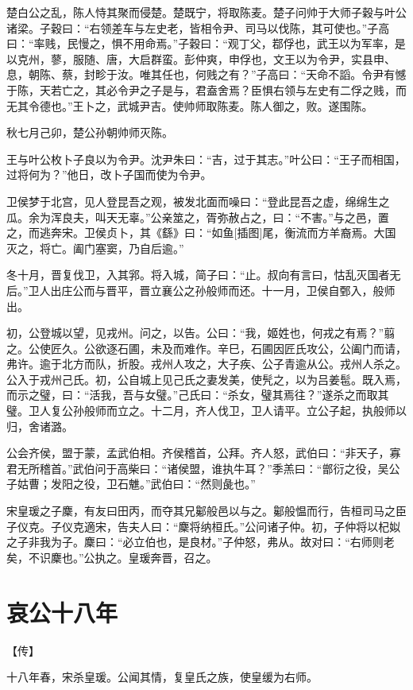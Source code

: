 \documentclass[a4paper,12pt,UTF8,twoside]{ctexbook}
\begin{document}
楚白公之乱，陈人恃其聚而侵楚。楚既宁，将取陈麦。楚子问帅于大师子穀与叶公诸梁。子穀曰：“右领差车与左史老，皆相令尹、司马以伐陈，其可使也。”子高曰：“率贱，民慢之，惧不用命焉。”子穀曰：“观丁父，鄀俘也，武王以为军率，是以克州，蓼，服随、唐，大启群蛮。彭仲爽，申俘也，文王以为令尹，实县申、息，朝陈、蔡，封畛于汝。唯其任也，何贱之有？”子高曰：“天命不謟。令尹有憾于陈，天若亡之，其必令尹之子是与，君盍舍焉？臣惧右领与左史有二俘之贱，而无其令德也。”王卜之，武城尹吉。使帅师取陈麦。陈人御之，败。遂围陈。

秋七月己卯，楚公孙朝帅师灭陈。

王与叶公枚卜子良以为令尹。沈尹朱曰：“吉，过于其志。”叶公曰：“王子而相国，过将何为？”他日，改卜子国而使为令尹。

卫侯梦于北宫，见人登昆吾之观，被发北面而噪曰：“登此昆吾之虚，绵绵生之瓜。余为浑良夫，叫天无辜。”公亲筮之，胥弥赦占之，曰：“不害。”与之邑，置之，而逃奔宋。卫侯贞卜，其《繇》曰：“如鱼[插图]尾，衡流而方羊裔焉。大国灭之，将亡。阖门塞窦，乃自后逾。”

冬十月，晋复伐卫，入其郛。将入城，简子曰：“止。叔向有言曰，怙乱灭国者无后。”卫人出庄公而与晋平，晋立襄公之孙般师而还。十一月，卫侯自鄄入，般师出。

初，公登城以望，见戎州。问之，以告。公曰：“我，姬姓也，何戎之有焉？”翦之。公使匠久。公欲逐石圃，未及而难作。辛巳，石圃因匠氏攻公，公阖门而请，弗许。逾于北方而队，折股。戎州人攻之，大子疾、公子青逾从公。戎州人杀之。公入于戎州己氏。初，公自城上见己氏之妻发美，使髠之，以为吕姜髢。既入焉，而示之璧，曰：“活我，吾与女璧。”己氏曰：“杀女，璧其焉往？”遂杀之而取其璧。卫人复公孙般师而立之。十二月，齐人伐卫，卫人请平。立公子起，执般师以归，舍诸潞。

公会齐侯，盟于蒙，孟武伯相。齐侯稽首，公拜。齐人怒，武伯曰：“非天子，寡君无所稽首。”武伯问于高柴曰：“诸侯盟，谁执牛耳？”季羔曰：“鄫衍之役，吴公子姑曹；发阳之役，卫石魋。”武伯曰：“然则彘也。”

宋皇瑗之子麇，有友曰田丙，而夺其兄酁般邑以与之。酁般愠而行，告桓司马之臣子仪克。子仪克適宋，告夫人曰：“麇将纳桓氏。”公问诸子仲。初，子仲将以杞姒之子非我为子。麇曰：“必立伯也，是良材。”子仲怒，弗从。故对曰：“右师则老矣，不识麇也。”公执之。皇瑗奔晋，召之。


\section{哀公十八年}



【传】

十八年春，宋杀皇瑗。公闻其情，复皇氏之族，使皇缓为右师。
\end{document}
